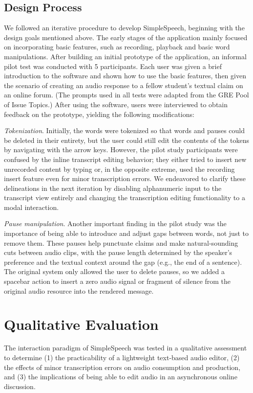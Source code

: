 \documentclass{sigchi}
\begin{document}
\subsection{Design Process}
We followed an iterative procedure to develop SimpleSpeech, beginning with the design goals mentioned above.
The early stages of the application mainly focused on incorporating basic features, such as recording, playback and basic word manipulations. 
After building an initial prototype of the application, an informal pilot test was conducted with 5 participants. 
Each user was given a brief introduction to the software and shown how to use the basic features, then given the scenario of creating an audio response to a fellow student's textual claim on an online forum. 
(The prompts used in all tests were adapted from the GRE Pool of Issue Topics.) 
After using the software, users were interviewed to obtain feedback on the prototype, yielding the following modifications:

\emph{Tokenization}. 
Initially, the words were tokenized so that words and pauses could be deleted in their entirety, but the user could still edit the contents of the tokens by navigating with the arrow keys.
However, the pilot study participants were confused by the inline transcript editing behavior; they either tried to insert new unrecorded content by typing or, in the opposite extreme, used the recording insert feature even for minor transcription errors. 
We endeavored to clarify these delineations in the next iteration by disabling alphanumeric input to the transcript view entirely and changing the transcription editing functionality to a modal interaction.

\emph{Pause manipulation}.
Another important finding in the pilot study was the importance of being able to introduce and adjust gaps between words, not just to remove them. 
These pauses help punctuate claims and make natural-sounding cuts between audio clips, with the pause length determined by the speaker's preference and the textual context around the gap (e.g., the end of a sentence). 
The original system only allowed the user to delete pauses, so we added a spacebar action to insert a zero audio signal or fragment of silence from the original audio resource into the rendered message. 

\section{Qualitative Evaluation}

The interaction paradigm of SimpleSpeech was tested in a qualitative assessment to determine (1) the practicability of a lightweight text-based audio editor, (2) the effects of minor transcription errors on audio consumption and production, and (3) the implications of being able to edit audio in an asynchronous online discussion.
\end{document}
